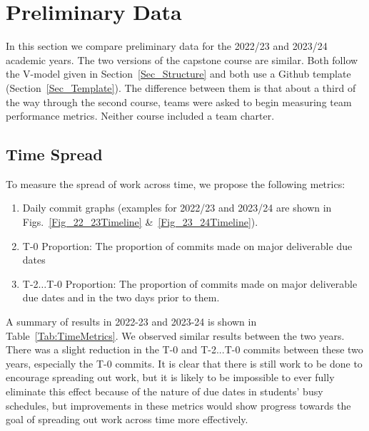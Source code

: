 \documentclass[10pt, conference]{IEEEtran}
\begin{document}
\section{Preliminary Data} \label{SecPrelimData}

In this section we compare preliminary data for the 2022/23 and 2023/24 academic
years.  The two versions of the capstone course are similar.  Both follow the
V-model given in Section~\ref{Sec_Structure} and both use a Github template
(Section~\ref{Sec_Template}). The difference between them is that about a third
of the way through the second course, teams were asked to begin measuring team
performance metrics.  Neither course included a team charter.

\subsection{Time Spread}\label{Subsec:TimeSpread}

To measure the spread of work across time, we propose the following
metrics:

\begin{enumerate}
\item Daily commit graphs (examples for 2022/23 and 2023/24 are shown in
Figs.~\ref{Fig_22_23Timeline} \&~\ref{Fig_23_24Timeline}).
\item T-0 Proportion: The proportion of commits made on major deliverable due dates
\item T-2$\ldots$T-0 Proportion: The proportion of commits made on major deliverable due
      dates and in the two days prior to them.
\end{enumerate}

A summary of results in 2022-23 and 2023-24 is shown in Table~\ref{Tab:TimeMetrics}.
We observed similar results between the two years. There was a slight reduction in the 
T-0 and T-2...T-0 commits between these two
years, especially the T-0 commits. It is clear that there is still work to be done to
encourage spreading out work, but it is likely to be impossible to ever fully eliminate
this effect because of the nature of due dates in students' busy schedules, but
improvements in these metrics would show progress towards the goal of spreading out
work across time more effectively.
\end{document}
